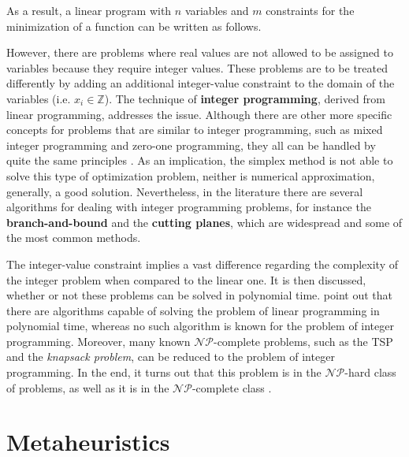 \documentclass[tuberlin,cic,tc,openright,english,noabntcite,oneside]{iiufrgs}
\begin{document}
As a result, a linear program with $n$ variables and $m$ constraints for the minimization of a function can be written as follows.

However, there are problems where real values are not allowed to be assigned to variables because they require integer values. These problems are to be treated differently by adding an additional integer-value constraint to the domain of the variables (i.e. $x_{i} \in \mathbb{Z}$). The technique of \textbf{integer programming}, derived from linear programming, addresses the issue. Although there are other more specific concepts for problems that are similar to integer programming, such as mixed integer programming and zero-one programming, they all can be handled by quite the same principles \parencite[p. 175]{shenoy_linear_2007}. As an implication, the simplex method is not able to solve this type of optimization problem, neither is numerical approximation, generally, a good solution. Nevertheless, in the literature there are several algorithms for dealing with integer programming problems, for instance the \textbf{branch-and-bound} and the \textbf{cutting planes}, which are widespread and some of the most common methods.

The integer-value constraint implies a vast difference regarding the complexity of the integer problem when compared to the linear one. It is then discussed, whether or not these problems can be solved in polynomial time. \textcite{wolsey_integer_2014} point out that there are algorithms capable of solving the problem of linear programming in polynomial time, whereas no such algorithm is known for the problem of integer programming. Moreover, many known $\mathcal{NP}$-complete problems, such as the TSP and the \emph{knapsack problem}, can be reduced to the problem of integer programming. In the end, it turns out that this problem is in the $\mathcal{NP}$-hard class of problems, as well as it is in the $\mathcal{NP}$-complete class \parencite[p. 21]{schrijver_theory_1998}.

\section{Metaheuristics}
\end{document}
